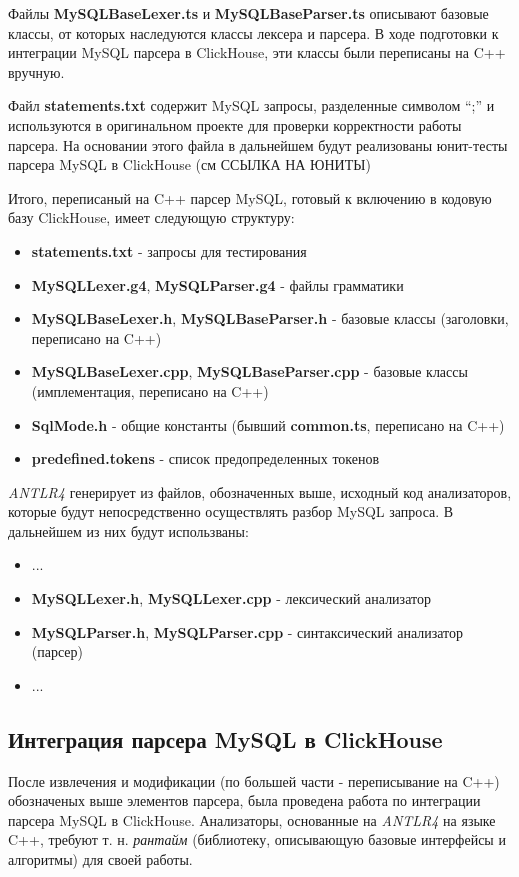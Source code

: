 Файлы \textbf{MySQLBaseLexer.ts} и \textbf{MySQLBaseParser.ts} описывают базовые классы, от которых наследуются классы лексера и парсера. В ходе подготовки к интеграции MySQL парсера в ClickHouse, эти классы были переписаны на C++ вручную. 

Файл \textbf{statements.txt} содержит MySQL запросы, разделенные символом \enquote{;} и используются в оригинальном проекте для проверки корректности работы парсера. На основании этого файла в дальнейшем будут реализованы юнит-тесты парсера MySQL в ClickHouse (см ССЫЛКА НА ЮНИТЫ)

Итого, переписаный на C++ парсер MySQL, готовый к включению в кодовую базу ClickHouse, имеет следующую структуру:
\begin{itemize}
    \item \textbf{statements.txt} - запросы для тестирования
    \item \textbf{MySQLLexer.g4}, \textbf{MySQLParser.g4} - файлы грамматики
    \item \textbf{MySQLBaseLexer.h}, \textbf{MySQLBaseParser.h} - базовые классы (заголовки, переписано на C++)
    \item \textbf{MySQLBaseLexer.cpp}, \textbf{MySQLBaseParser.cpp} - базовые классы (имплементация, переписано на C++)
    \item \textbf{SqlMode.h} - общие константы (бывший \textbf{common.ts}, переписано на C++)
    \item \textbf{predefined.tokens} - список предопределенных токенов
\end{itemize}

\pagebreak

\textit{ANTLR4} генерирует из файлов, обозначенных выше, исходный код анализаторов, которые будут непосредственно осуществлять разбор MySQL запроса. В дальнейшем из них будут использваны:

\begin{itemize}
    \item ...
    \item \textbf{MySQLLexer.h}, \textbf{MySQLLexer.cpp} - лексический анализатор
    \item \textbf{MySQLParser.h}, \textbf{MySQLParser.cpp} - синтаксический анализатор (парсер)
    \item ...
\end{itemize}

\subsection{Интеграция парсера MySQL в ClickHouse}
После извлечения и модификации (по большей части - переписывание на C++) обозначеных выше элементов парсера, была проведена работа по интеграции парсера MySQL в ClickHouse. Анализаторы, основанные на \textit{ANTLR4} на языке C++, требуют т. н. \textit{рантайм} (библиотеку, описывающую базовые интерфейсы и алгоритмы) для своей работы. 

